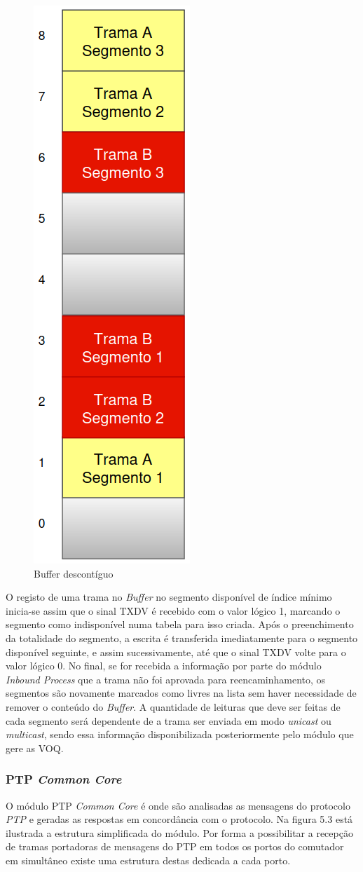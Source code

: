 \begin{figure}[H]
  \centering
  \includegraphics[width=0.2 \textwidth]{Segments2.png}
  \caption[Buffer descontíguo]{Buffer descontíguo}
  \label{fig:airbus1}
\end{figure} 



 
O registo de uma trama no \textit{Buffer} no segmento disponível de índice mínimo inicia-se assim que o sinal TXDV é recebido com o valor lógico 1, marcando o segmento como indisponível numa tabela para isso criada. Após o preenchimento da totalidade do segmento, a escrita é transferida imediatamente para o segmento disponível seguinte, e assim sucessivamente, até que o sinal TXDV volte para o valor lógico 0. No final, se for recebida a informação por parte do módulo \textit{Inbound Process} que a trama não foi aprovada para reencaminhamento, os segmentos são novamente marcados como livres na lista sem haver necessidade de remover o conteúdo do \textit{Buffer}. A quantidade de leituras que deve ser feitas de cada segmento será dependente de a trama ser enviada em modo \textit{unicast} ou \textit{multicast}, sendo essa informação disponibilizada posteriormente pelo módulo que gere as VOQ. 

\subsubsection{PTP \textit{Common Core}}

O módulo PTP \textit{Common Core} é onde são analisadas as mensagens do protocolo \textit{PTP} e geradas as respostas em concordância com o protocolo. Na figura 5.3 está ilustrada a estrutura simplificada do módulo. Por forma a possibilitar a recepção de tramas portadoras de mensagens do PTP em todos os portos do comutador em simultâneo existe uma estrutura destas dedicada a cada porto. 


